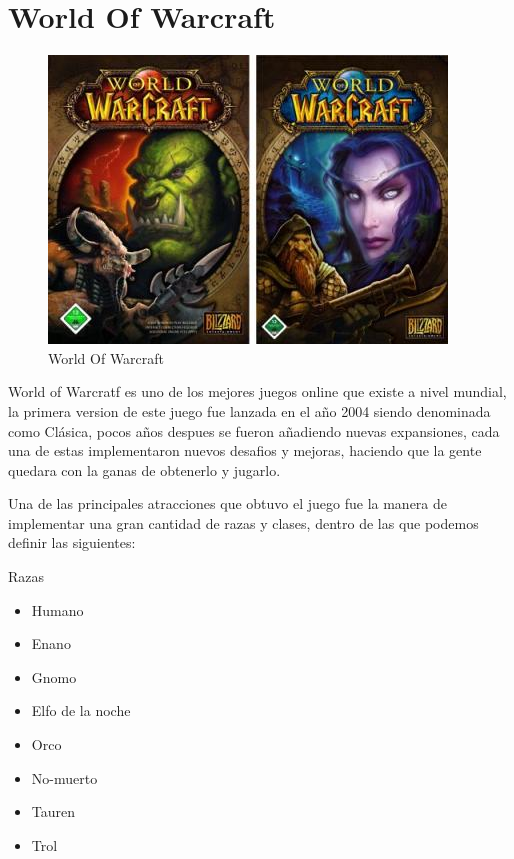 \section{World Of Warcraft}

\begin{figure}[htbp]
\begin{center}
\includegraphics[width=.60\textwidth]{./imagenes/wowclasic.jpg}
\caption{World Of Warcraft}
\label{World Of Warcraft}
\end{center}
\end{figure}

World of Warcratf es uno de los mejores juegos online que existe a nivel mundial, la primera version de este juego fue lanzada en el año 2004 siendo denominada como Clásica, pocos años despues se fueron añadiendo nuevas expansiones, cada una de estas implementaron nuevos desafios y mejoras, haciendo que la gente quedara con la ganas de obtenerlo y jugarlo.

Una de las principales atracciones que obtuvo el juego fue la manera de implementar una gran cantidad de razas y clases, dentro de las que podemos definir las siguientes:

\large{Razas}
\begin{itemize}
\item Humano  \item Enano  \item Gnomo  \item Elfo de la noche 
\item Orco  \item No-muerto  \item Tauren  \item Trol
\end{itemize}

